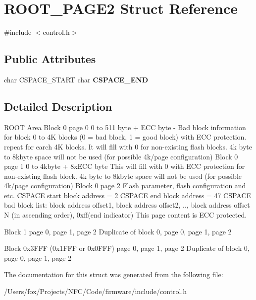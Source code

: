 \hypertarget{struct_r_o_o_t___p_a_g_e2}{
\section{ROOT\_\-PAGE2 Struct Reference}
\label{struct_r_o_o_t___p_a_g_e2}
}


{\ttfamily \#include $<$control.h$>$}

\subsection*{Public Attributes}
\begin{DoxyCompactItemize}
\item 
\hypertarget{struct_r_o_o_t___p_a_g_e2_a18636f64ee53577ed27a86d89290ee91}{
char CSPACE\_\-START char {\bfseries CSPACE\_\-END}}
\label{struct_r_o_o_t___p_a_g_e2_a18636f64ee53577ed27a86d89290ee91}

\end{DoxyCompactItemize}


\subsection{Detailed Description}
ROOT Area Block 0 page 0 0 to 511 byte + ECC byte -\/ Bad block information for block 0 to 4K blocks (0 = bad block, 1 = good block) with ECC protection. repeat for earch 4K blocks. It will fill with 0 for non-\/existing flash blocks. 4k byte to 8kbyte space will not be used (for possible 4k/page configuration) Block 0 page 1 0 to 4kbyte + 8xECC byte This will fill with 0 with ECC protection for non-\/existing flash block. 4k byte to 8kbyte space will not be used (for possible 4k/page configuration) Block 0 page 2 Flash parameter, flash configuration and etc. CSPACE start block address = 2 CSPACE end block address = 47 CSPACE bad block list: block address offset1, block address offset2, .., block address offset N (in ascending order), 0xff(end indicator) This page content is ECC protected.

Block 1 page 0, page 1, page 2 Duplicate of block 0, page 0, page 1, page 2

Block 0x3FFF (0x1FFF or 0x0FFF) page 0, page 1, page 2 Duplicate of block 0, page 0, page 1, page 2 

The documentation for this struct was generated from the following file:\begin{DoxyCompactItemize}
\item 
/Users/fox/Projects/NFC/Code/firmware/include/control.h\end{DoxyCompactItemize}
